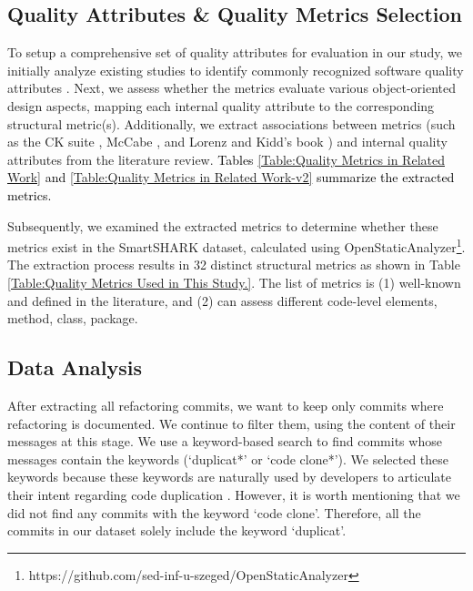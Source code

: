 \subsection{Quality Attributes \& Quality Metrics Selection}
To setup a comprehensive set of quality attributes for evaluation in our study, we initially analyze existing studies to identify commonly recognized software quality attributes \citep{chidamber1994metrics,lorenz1994object,mccabe1976complexity, henry1981software, nejmeh1988npath, Destefanis:2014:SMA:2813544.2813555}. Next, we assess whether the metrics evaluate various object-oriented design aspects, mapping each internal quality attribute to the corresponding structural metric(s). %
  Additionally, we extract associations between metrics (such as the CK suite \citep{chidamber1994metrics}, McCabe \citep{mccabe1976complexity}, and Lorenz and Kidd's book \citep{lorenz1994object}) and internal quality attributes from the literature review. \textcolor{black}{Tables \ref{Table:Quality Metrics in Related Work} and \ref{Table:Quality Metrics in Related Work-v2} summarize the extracted metrics.}

Subsequently, we examined the extracted metrics to determine whether these metrics exist in the SmartSHARK dataset, calculated using OpenStaticAnalyzer\footnote{https://github.com/sed-inf-u-szeged/OpenStaticAnalyzer}. The extraction process results in 32 distinct structural metrics as shown in Table \ref{Table:Quality Metrics Used in This Study.}. The list of metrics is (1) well-known and defined in the literature, and (2) can assess different code-level elements, \ie method, class, package. %


\subsection{Data Analysis}
\label{dataanslysis}



After extracting all refactoring commits, we want to keep only commits where refactoring is documented. We continue to filter them, using the content of their messages at this stage. We use a keyword-based search to find commits whose messages contain the keywords (\ie `duplicat*' or `code clone*'). We selected these keywords because these keywords are naturally used by developers to articulate their intent regarding code duplication \citep{alomar2019can,alomar2021we}. However, it is worth mentioning that we did not find any commits with the keyword `code clone'. Therefore, all the commits in our dataset solely include the keyword `duplicat'.

